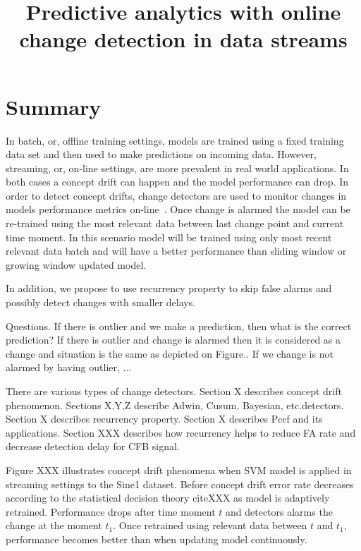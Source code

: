 \documentclass[12 pt]{article}
\title{Predictive analytics with online change detection in data streams}
\date{}
\begin{document}
	\maketitle
  \section{Summary}
  In batch, or, offline training settings, models are trained using a fixed training data set and then used to make predictions on incoming data. 
  However, streaming, or, on-line settings, are more prevalent in real world applications. 
  In both cases a concept drift can happen and the model performance can drop. 
  In order to detect concept drifts, change detectors are used to monitor changes in models performance metrics on-line~\cite{gama2004learning}. 
  Once change is alarmed the model can be re-trained using the most relevant data between last change point and current time moment.
  In this scenario model will be trained using only most recent relevant data batch and will have a better performance than sliding window or growing window updated model.

  In addition, we propose to use recurrency property to skip false alarms and possibly detect changes with smaller delays.

  Questions.
  If there is outlier and we make a prediction, then what is the correct prediction?
  If there is outlier and change is alarmed then it is considered as a change and situation is the same as depicted on Figure..
  If we change is not alarmed by having outlier, ...

  There are various types of change detectors. 
  Section X describes concept drift phenomenon.
  Sections X,Y,Z describe Adwin, Cusum, Bayesian, etc.detectors.
  Section X describes recurrency property.
  Section X describes Pccf and its applications.
  Section XXX describes how recurrency helps to reduce FA rate and decrease detection delay for CFB signal.

  Figure XXX illustrates concept drift phenomena when SVM model is applied in streaming settings to the Sine1 dataset. 
  Before concept drift error rate decreases according to the statistical decision theory cite{XXX} as model is adaptively retrained. 
  Performance drops after time moment $t$ and detectors alarms the change at the moment $t_1$. 
  Once retrained using relevant data between $t$ and $t_1$, performance becomes better than when updating model continuously.
\end{document}
